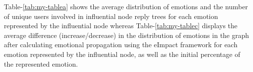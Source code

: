 Table-\ref{tab:my-tablea} shows the average distribution of emotions and the number of unique users involved in influential node reply trees for each emotion represented by the influential node whereas Table-\ref{tab:my-tablec} displays the average difference (increase/decrease) in the distribution of emotions in the graph after calculating emotional propagation using the eImpact framework for each emotion represented by the influential node, as well as the initial percentage of the represented emotion.

\begin{table}[h]
\caption{Average distribution of emotions and the number of unique users in the reply trees of influential nodes}
\label{tab:my-tablea}
\end{table}

